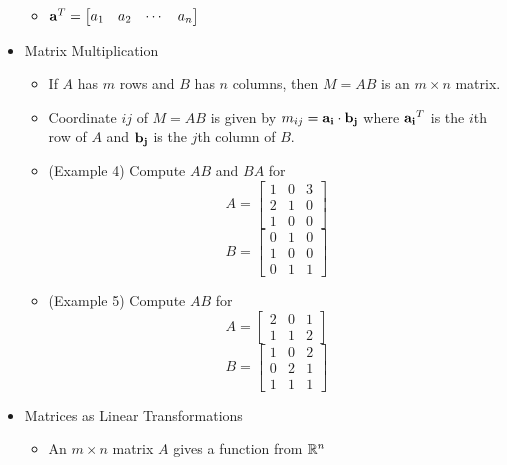 \documentclass[11pt]{article}
\begin{document}
\begin{itemize}
\begin{itemize}
        \)
      \item
        \(
          \mathbf{a}^T
            =
          \begin{bmatrix}
            a_{1} & a_{2} & \cdots & a_{n}
          \end{bmatrix}
        \)
    \end{itemize}
  \item Matrix Multiplication
    \begin{itemize}
      \item
        If \(A\) has \(m\) rows and \(B\) has \(n\) columns,
        then \(M=AB\) is an \(m\times n\) matrix.
      \item
        Coordinate \(ij\) of \(M=AB\) is given by
        \(m_{ij}=\mathbf{a_i}\cdot\mathbf{b_j}\)
        where \(\mathbf{a_i}^T\) is the \(i\)th row of \(A\)
        and \(\mathbf{b_j}\) is the \(j\)th column of \(B\).
      \item
        (Example 4) Compute \(AB\) and \(BA\) for
        \[
          A =
          \begin{bmatrix}
            1 & 0 & 3 \\
            2 & 1 & 0 \\
            1 & 0 & 0
          \end{bmatrix}
        \]
        \[
          B =
          \begin{bmatrix}
            0 & 1 & 0 \\
            1 & 0 & 0 \\
            0 & 1 & 1
          \end{bmatrix}
        \]
      \item
        (Example 5) Compute \(AB\) for
        \[
          A =
          \begin{bmatrix}
            2 & 0 & 1 \\
            1 & 1 & 2
          \end{bmatrix}
        \]
        \[
          B =
          \begin{bmatrix}
            1 & 0 & 2 \\
            0 & 2 & 1 \\
            1 & 1 & 1
          \end{bmatrix}
        \]
    \end{itemize}
  \item Matrices as Linear Transformations
    \begin{itemize}
      \item An \(m\times n\) matrix \(A\) gives a function from \(\mathbb R^n\)

\end{itemize}
\end{itemize}
\end{document}
